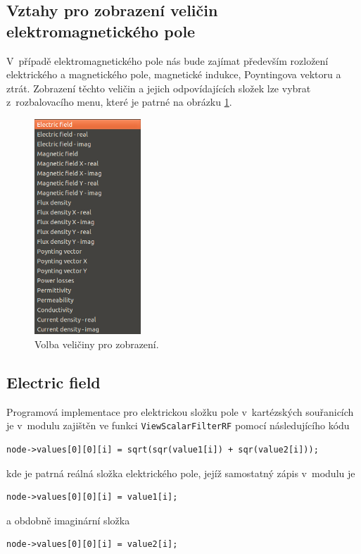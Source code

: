 \subsection{Vztahy pro zobrazení veličin elektromagnetického pole}
V~případě elektromagnetického pole nás bude zajímat především rozložení elektrického a magnetického pole, magnetické indukce, Poyntingova vektoru a ztrát. Zobrazení těchto  veličin a jejich odpovídajících složek lze vybrat z~rozbalovacího menu, které je patrné na obrázku \ref{obr:sim_zobrazeni}.
\begin{figure}[!h]
	\centering
	\includegraphics[width=4cm]{sim_zobrazeni.png}
	\caption{Volba veličiny pro zobrazení.}
	\label{obr:sim_zobrazeni}
\end{figure}
 
\subsection*{Electric field}
Programová implementace pro elektrickou složku pole v~kartézských souřanicích je v~modulu zajištěn ve funkci \texttt{ViewScalarFilterRF} pomocí následujícího kódu
\begin{verbatim}
node->values[0][0][i] = sqrt(sqr(value1[i]) + sqr(value2[i]));
\end{verbatim}
kde je patrná reálná složka elektrického pole, jejíž samostatný zápis v~modulu je
\begin{verbatim}
node->values[0][0][i] = value1[i];
\end{verbatim}
a obdobně imaginární složka 
\begin{verbatim}
node->values[0][0][i] = value2[i];
\end{verbatim}

